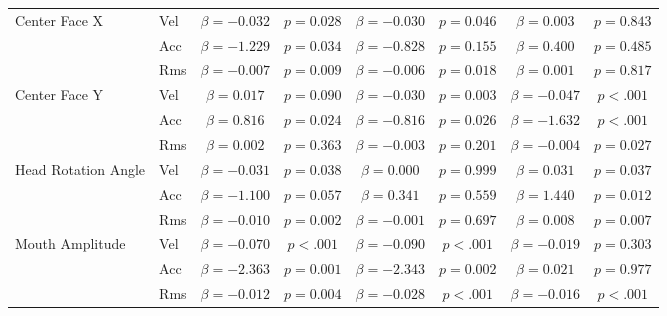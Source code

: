\begin{tabular}{llcc|cc|cc}
\midrule
\multirow{3}{*}{Center Face X} & Vel & $\beta = -0.032$ & $p = 0.028$ & $\beta = -0.030$ & $p = 0.046$ & $\beta = 0.003$ & $p = 0.843$ \\
 & Acc & $\beta = -1.229$ & $p = 0.034$ & $\beta = -0.828$ & $p = 0.155$ & $\beta = 0.400$ & $p = 0.485$ \\
 & Rms & $\beta = -0.007$ & $p = 0.009$ & $\beta = -0.006$ & $p = 0.018$ & $\beta = 0.001$ & $p = 0.817$ \\
\midrule
\multirow{3}{*}{Center Face Y} & Vel & $\beta = 0.017$ & $p = 0.090$ & $\beta = -0.030$ & $p = 0.003$ & $\beta = -0.047$ & $p < .001$ \\
 & Acc & $\beta = 0.816$ & $p = 0.024$ & $\beta = -0.816$ & $p = 0.026$ & $\beta = -1.632$ & $p < .001$ \\
 & Rms & $\beta = 0.002$ & $p = 0.363$ & $\beta = -0.003$ & $p = 0.201$ & $\beta = -0.004$ & $p = 0.027$ \\
\midrule
\multirow{3}{*}{Head Rotation Angle} & Vel & $\beta = -0.031$ & $p = 0.038$ & $\beta = 0.000$ & $p = 0.999$ & $\beta = 0.031$ & $p = 0.037$ \\
 & Acc & $\beta = -1.100$ & $p = 0.057$ & $\beta = 0.341$ & $p = 0.559$ & $\beta = 1.440$ & $p = 0.012$ \\
 & Rms & $\beta = -0.010$ & $p = 0.002$ & $\beta = -0.001$ & $p = 0.697$ & $\beta = 0.008$ & $p = 0.007$ \\
\midrule
\multirow{3}{*}{Mouth Amplitude} & Vel & $\beta = -0.070$ & $p < .001$ & $\beta = -0.090$ & $p < .001$ & $\beta = -0.019$ & $p = 0.303$ \\
 & Acc & $\beta = -2.363$ & $p = 0.001$ & $\beta = -2.343$ & $p = 0.002$ & $\beta = 0.021$ & $p = 0.977$ \\
 & Rms & $\beta = -0.012$ & $p = 0.004$ & $\beta = -0.028$ & $p < .001$ & $\beta = -0.016$ & $p < .001$ \\
\midrule
\bottomrule
\end{tabular}
